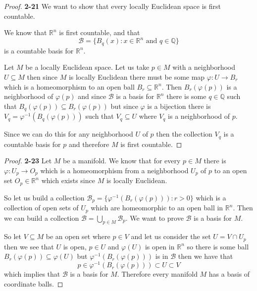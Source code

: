 \documentclass[11pt]{article}
\newcommand{\Q}{\mathbb{Q}}
\newcommand{\R}{\mathbb{R}}
\theoremstyle{definition}
\begin{document}
\begin{proof}{\textbf{2-21}}
    We want to show that every locally Euclidean space is first countable.

    We know that $\R^n$ is first countable, and that
    $$\mathcal{B} = \{B_q(x): x \in \R^n \text{ and }q \in \Q\}$$
    is a countable basis for $\R^n$.
    
    Let $M$ be a locally Euclidean space.
    Let us take $p \in M$ with a neighborhood $U \subseteq M$ then since
    $M$ is locally Euclidean there must be some map $\varphi:U \to B_r$
    which is a homeomorphism to an open ball $B_r \subseteq \R^n$.  
    Then $B_r(\varphi(p))$ is a neighborhood of $\varphi(p)$ and since
    $\mathcal{B}$ is a basis for $\R^n$ there is some $q \in \Q$ such that
    $B_q(\varphi(p)) \subseteq B_r(\varphi(p))$ but since $\varphi$ is a
    bijection there is $V_q = \varphi^{-1}(B_q(\varphi(p)))$ such that
    $V_q \subseteq U$ where $V_q$ is a neighborhood of $p$.
    
    Since we can do this for any neighborhood $U$ of $p$ then the collection
    $V_q$ is a countable basis for $p$ and therefore $M$ is first countable.
\end{proof}
\begin{proof}{\textbf{2-23}}
    Let $M$ be a manifold. We know that for every $p \in M$ there is
    $\varphi: U_p \to O_p$ which is a homeomorphism from a neighborhood
    $U_p$ of $p$ to an open set $O_p \in \R^n$ which exists since $M$ is
    locally Euclidean.

    So let us build a collection $\mathcal{B}_p = \{\varphi^{-1}(B_r(\varphi(p))) : r>0\}$
    which is a collection of open sets of $U_p$ which are homeomorphic
    to an open ball in $\R^n$.
    Then we can build a collection $\mathcal{B} = \bigcup_{p \in M} \mathcal{B}_p$.
    We want to prove $\mathcal{B}$ is a basis for $M$.

    So let $V \subseteq M$ be an open set where $p \in V$ and let us consider
    the set $U = V \cap U_p$ then we see that $U$ is open, $p \in U$ and
    $\varphi(U)$ is open in $\R^n$ so there is some ball
    $B_r(\varphi(p)) \subseteq \varphi(U)$ but $\varphi^{-1}(B_r(\varphi(p)))$
    is in $\mathcal{B}$ then we have that
    $$p \in \varphi^{-1}(B_r(\varphi(p))) \subset U \subset V$$
    which implies that $\mathcal{B}$ is a basis for $M$.
    Therefore every manifold $M$ has a basis of coordinate balls. 
\end{proof}
\end{document}
